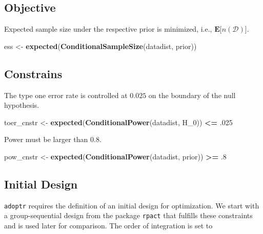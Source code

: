 \documentclass[]{book}
\newenvironment{Shaded}{\begin{snugshade}}{\end{snugshade}}
\newcommand{\DecValTok}[1]{\textcolor[rgb]{0.00,0.00,0.81}{#1}}
\newcommand{\FloatTok}[1]{\textcolor[rgb]{0.00,0.00,0.81}{#1}}
\newcommand{\KeywordTok}[1]{\textcolor[rgb]{0.13,0.29,0.53}{\textbf{#1}}}
\newcommand{\NormalTok}[1]{#1}
\newcommand{\OperatorTok}[1]{\textcolor[rgb]{0.81,0.36,0.00}{\textbf{#1}}}
\newcommand{\StringTok}[1]{\textcolor[rgb]{0.31,0.60,0.02}{#1}}
\begin{document}
\hypertarget{objective}{%
\subsection{Objective}\label{objective}}

Expected sample size under the respective prior is minimized, i.e.,
\(\boldsymbol{E}\big[n(\mathcal{D})\big]\).

\begin{Shaded}
\begin{Highlighting}[]
\NormalTok{ess <-}\StringTok{ }\KeywordTok{expected}\NormalTok{(}\KeywordTok{ConditionalSampleSize}\NormalTok{(datadist, prior))}
\end{Highlighting}
\end{Shaded}

\hypertarget{constrains}{%
\subsection{Constrains}\label{constrains}}

The type one error rate is controlled at \(0.025\) on the boundary of the
null hypothesis.

\begin{Shaded}
\begin{Highlighting}[]
\NormalTok{toer_cnstr <-}\StringTok{ }\KeywordTok{expected}\NormalTok{(}\KeywordTok{ConditionalPower}\NormalTok{(datadist, H_}\DecValTok{0}\NormalTok{)) }\OperatorTok{<=}\StringTok{ }\FloatTok{.025}
\end{Highlighting}
\end{Shaded}

Power must be larger than \(0.8\).

\begin{Shaded}
\begin{Highlighting}[]
\NormalTok{pow_cnstr <-}\StringTok{ }\KeywordTok{expected}\NormalTok{(}\KeywordTok{ConditionalPower}\NormalTok{(datadist, prior)) }\OperatorTok{>=}\StringTok{ }\FloatTok{.8}
\end{Highlighting}
\end{Shaded}

\hypertarget{initial-design}{%
\subsection{Initial Design}\label{initial-design}}

\texttt{adoptr} requires the definition of an initial design for optimization.
We start with a group-sequential design from the package \texttt{rpact} that
fulfills these constraints and is used later for comparison.
The order of integration is set to
\end{document}

